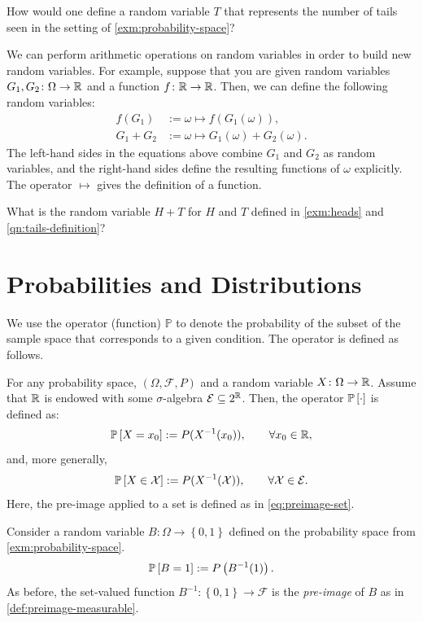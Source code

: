 \documentclass[letterpaper,11pt]{article}
\begin{document}
\begin{question} \label{qn:tails-definition}
How would one define a random variable $T$ that represents the number of tails seen in the setting of \cref{exm:probability-space}? 
\end{question}

We can perform arithmetic operations on random variables in order to build new random variables. For example, suppose that you are given random variables $G_1, G_2\colon \Omega \to \Real$ and a function $f\colon \Real \to \Real$. Then, we can define the following random variables:
\begin{align*}
  f(G_1) &:=  \omega \mapsto f(G_1(\omega)),\\
  G_1+ G_2 &:=  \omega \mapsto G_1(\omega) + G_2(\omega).
\end{align*}
The left-hand sides in the equations above combine $G_1$ and $G_2$ as random variables, and the right-hand sides define the resulting functions of $\omega$ explicitly. The operator $\mapsto$ gives the definition of a function. 


\begin{question}
What is the random variable $H + T$ for $H$ and $T$ defined in \cref{exm:heads} and \cref{qn:tails-definition}?
\end{question}

\section{Probabilities and Distributions}
\label{sec:prob-distr}


We use the operator (function) $\mathbb{P}$ to denote the probability of the subset of the sample space that corresponds to a given condition. The operator is defined as follows.
\begin{defn}
  For any probability space, $(\Omega, \mathcal{F}, P)$ and a random variable $X\colon \Omega \to \Real$. Assume that $\Real$ is endowed with some $\sigma$-algebra $\mathcal{E}\subseteq 2^{\Real}$. Then, the operator $\P{\cdot }$ is defined as:
  \[
   \P{X = x_0} := P(X^{-1}(x_0)), \qquad \forall x_0\in \Real, 
 \]
 and, more generally,
 \[
   \P{X \in \mathcal{X}} := P(X^{-1}(\mathcal{X})), \qquad \forall \mathcal{X} \in \mathcal{E}. 
 \]
 Here, the pre-image applied to a set is defined as in \eqref{eq:preimage-set}.
\end{defn}


Consider a random variable $B\colon \Omega \to \left\{ 0,1 \right\}$ defined on the probability space from \cref{exm:probability-space}. 
\[
  \P{B = 1} := P\left(B^{-1}(1)\right) .
\]
As before, the set-valued function $B^{-1}\colon \left\{ 0,1 \right\} \to \mathcal{F}$ is the \emph{pre-image} of $B$ as in \cref{def:preimage-measurable}.
\end{document}

